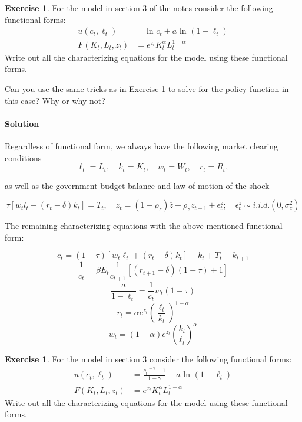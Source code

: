 \documentclass[letterpaper,12pt]{article}
\theoremstyle{definition}
\newtheorem{exercise}[theorem]{Exercise}
\begin{document}
\begin{spacing}{1.5}
	\begin{exercise} \label{DSGE_HW_CharEq_Ln}
		For the model in section 3 of the notes consider the following functional forms:
		\begin{equation}\label{DSGE_HW_CharEq_Ln_eq01}
		\begin{split}
		u(c_t,\ell_t) & = \text{ln }c_t + a \text{ ln }(1-\ell_t)\\
		F(K_t,L_t,z_t) & = e^{z_t}K^{\alpha}_t L^{1-\alpha}_t  \nonumber
		\end{split}
		\end{equation}
		Write out all the characterizing equations for the model using these functional forms.

		Can you use the same tricks as in Exercise 1 to solve for the policy function in this case?  Why or why not?
	\end{exercise}

\paragraph{Solution} Regardless of functional form, we always have the following market clearing conditions
$$\ell_t = L_t, \quad k_t = K_t, \quad w_t = W_t, \quad r_t = R_t ,$$

as well as the government budget balance and law of motion of the shock

$$ \tau [w_tl_t + (r_t - \delta)k_t] = T_t, \quad z_t = ( 1 - \rho_z )\overline{z} + \rho_z z_{t - 1} + \epsilon_t^z; \quad \epsilon_t^z \sim i.i.d.(0, \sigma_z^2)$$

The remaining characterizing equations with the above-mentioned functional form:

$$c_t = (1 - \tau)[w_t\ell_t + (r_t - \delta) k_t] + k_t + T_t - k_{t + 1} $$
$$\frac{1}{c_t} = \beta E_t{\frac{1}{c_{t + 1}} [ (r_{t + 1} -\delta)(1 - \tau) + 1]} $$
$$ \frac{a}{1 - \ell_t} = \frac{1}{c_t} w_t (1 - \tau) $$
$$r_t = \alpha e^{z_t} (\frac{ \ell_t}{k_t})^{1 - \alpha} $$
$$w_t = (1 - \alpha) e^{z_t} (\frac{k_t}{\ell_t})^\alpha$$

	\begin{exercise} \label{DSGE_HW_CharEq_CES_Ln}
		For the model in section 3 consider the following functional forms:
		\begin{equation}\label{DSGE_HW_CharEq_CES_Ln_eq01}
		\begin{split}
		u(c_t,\ell_t) & = \frac{c^{1-\gamma}_t -1}{1-\gamma}+ a \text{ ln }(1-\ell_t)\\
		F(K_t,L_t,z_t) & = e^{z_t}K^{\alpha}_t L^{1-\alpha}_t  \nonumber
		\end{split}
		\end{equation}
		Write out all the characterizing equations for the model using these functional forms.
	\end{exercise}


\end{spacing}
\end{document}
